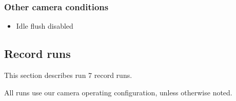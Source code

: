 \subsubsection{Other camera conditions}\label{other-camera-conditions}

\begin{itemize}
\tightlist
\item
  Idle flush disabled
\end{itemize}

\subsection{Record runs}\label{record-runs}

This section describes run 7 record runs.

All runs use our camera operating configuration, unless otherwise noted.

